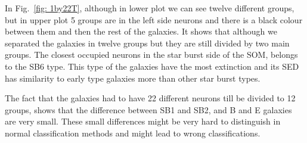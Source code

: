            In Fig.~\ref{fig: 1by22T}, although in lower plot we can see twelve different groups, but in upper plot 5 groups are in the left side neurons and there is a black colour between them and then the rest of the galaxies. 
            It shows that although we separated the galaxies in twelve groups but they are still divided by two main groups.
            The closest occupied neurons in the star burst side of the SOM, belongs to the SB6 type. 
            This type of the galaxies have the most extinction and its SED has similarity to early type galaxies more than other star burst types. 
            
            The fact that the galaxies had to have 22 different neurons till be divided to 12 groups, shows that the difference between SB1 and SB2, and B and E galaxies are very small.
            These small differences might be very hard to distinguish in normal classification methods and might lead to wrong classifications.

